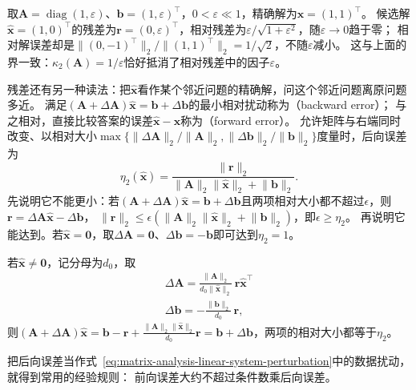 \begin{example}[反例：残差小而解误差大]
\label{ex:ls-small-residual-large-error}
取$\bm A=\operatorname{diag}(1,\varepsilon)$、$\bm b=(1,\varepsilon)^\top$，$0<\varepsilon\ll1$，精确解为$\bm x=(1,1)^\top$。
候选解$\widehat{\bm x}=(1,0)^\top$的残差为$\bm r=(0,\varepsilon)^\top$，相对残差为$\varepsilon/\sqrt{1+\varepsilon^2}$，随$\varepsilon\to0$趋于零；
相对解误差却是$\lVert(0,-1)^\top\rVert_2/\lVert(1,1)^\top\rVert_2=1/\sqrt2$，不随$\varepsilon$减小。
这与上面的界一致：$\kappa_2(\bm A)=1/\varepsilon$恰好抵消了相对残差中的因子$\varepsilon$。
\end{example}

残差还有另一种读法：把$\widehat{\bm x}$看作某个邻近问题的精确解，问这个邻近问题离原问题多近。
满足$(\bm A+\Delta\bm A)\widehat{\bm x}=\bm b+\Delta\bm b$的最小相对扰动称为（backward error）；
与之相对，直接比较答案的误差$\widehat{\bm x}-\bm x$称为（forward error）。
允许矩阵与右端同时改变、以相对大小$\max\{\lVert\Delta\bm A\rVert_2/\lVert\bm A\rVert_2,\lVert\Delta\bm b\rVert_2/\lVert\bm b\rVert_2\}$度量时，后向误差为
\begin{equation}
 \eta_2(\widehat{\bm x})
 =\frac{\lVert\bm r\rVert_2}
       {\lVert\bm A\rVert_2\lVert\widehat{\bm x}\rVert_2+\lVert\bm b\rVert_2}.
 \label{def:matrix-analysis-normwise-backward-error}
\end{equation}
先说明它不能更小：若$(\bm A+\Delta\bm A)\widehat{\bm x}=\bm b+\Delta\bm b$且两项相对大小都不超过$\epsilon$，则$\bm r=\Delta\bm A\widehat{\bm x}-\Delta\bm b$，
$\lVert\bm r\rVert_2\leq\epsilon(\lVert\bm A\rVert_2\lVert\widehat{\bm x}\rVert_2+\lVert\bm b\rVert_2)$，即$\epsilon\geq\eta_2$。
再说明它能达到。若$\widehat{\bm x}=\bm0$，取$\Delta\bm A=\bm0$、$\Delta\bm b=-\bm b$即可达到$\eta_2=1$。

若$\widehat{\bm x}\ne\bm0$，记分母为$d_0$，取
\[
 \begin{gathered}
\Delta\bm A=\frac{\lVert\bm A\rVert_2}{d_0\lVert\widehat{\bm x}\rVert_2}\,\bm r\widehat{\bm x}^\top\\
\Delta\bm b=-\frac{\lVert\bm b\rVert_2}{d_0}\,\bm r ,
 \end{gathered}
\]
则$(\bm A+\Delta\bm A)\widehat{\bm x}=\bm b-\bm r+\tfrac{\lVert\bm A\rVert_2\lVert\widehat{\bm x}\rVert_2}{d_0}\bm r=\bm b+\Delta\bm b$，两项的相对大小都等于$\eta_2$。

把后向误差当作式~\eqref{eq:matrix-analysis-linear-system-perturbation}中的数据扰动，就得到常用的经验规则：
前向误差大约不超过条件数乘后向误差。

